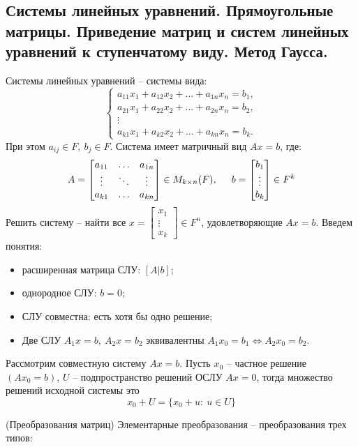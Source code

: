 \begin{multicols}{2}
\section{Системы линейных уравнений. Прямоугольные матрицы. Приведение матриц и систем
линейных уравнений к ступенчатому виду. Метод Гаусса.}
Системы линейных уравнений -- системы вида:
\[
    \left\{\begin{array}{c}
        a_{11}x_1 + a_{12}x_2 + \ldots + a_{1n}x_n = b_1,\\
        a_{21}x_1 + a_{22}x_2 + \ldots + a_{2n}x_n = b_2,\\
        \vdots\\
        a_{k1}x_1 + a_{k2}x_2 + \ldots + a_{kn}x_n = b_k.
    \end{array}\right.
    \]
При этом $a_{ij} \in F, \ b_j \in F$. Система имеет матричный вид $Ax=b$, где:
\[
    A = \begin{bmatrix}
        a_{11} &\ldots & a_{1n}\\
        \vdots & \ddots & \vdots\\
        a_{k1} & \ldots & a_{kn}
    \end{bmatrix} \in M_{k\times n}(F), \hspace*{0.5cm} b = \begin{bmatrix}
        b_1\\\vdots\\b_k
    \end{bmatrix} \in F^k
    \]
Решить систему -- найти все $x = \begin{bmatrix}
    x_1 \\\vdots \\x_k
\end{bmatrix} \in F^n$, удовлетворяющие $Ax=b$. Введем понятия:
\begin{itemize}
    \item[] расширенная матрица СЛУ: $[A | b]$;
    \item[] однородное СЛУ: $b = 0$;
    \item[] СЛУ совместна: есть хотя бы одно решение;
    \item[] Две СЛУ $A_1x = b, \ A_2x=b_2$ эквивалентны $A_1x_0 = b_1 \Longleftrightarrow A_2x_0 = b_2$.
\end{itemize}
Рассмотрим совместную систему $Ax=b$. Пусть $x_0$ -- частное решение $(Ax_0 = b)$, $U$ -- подпространство решений ОСЛУ $Ax=0$, тогда множество решений исходной системы это \useshortskip
\[
    x_0 + U = \{x_0 + u:\ u \in U\}
    \]
\begin{definition}{(Преобразования матриц)}{}
    Элементарные преобразования -- преобразования трех типов:\vspace*{0.3cm}


\end{definition}
\end{multicols}
